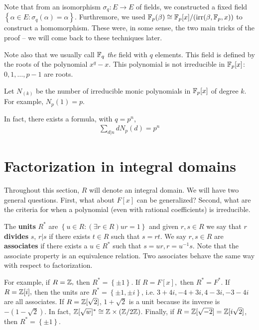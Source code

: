 \documentclass{../mathnotes}
\begin{document}
Note that from an isomorphism $\sigma_q:E\to E$ of fields, we constructed a fixed field $\left\{ \alpha\in E:\sigma_q(\alpha)=\alpha \right\}$.
Furthremore, we used $\mathbb{F}_p(\beta)\cong \mathbb{F}_p[x]/(\operatorname{irr}(\beta,\mathbb{F}_p,x))$ to construct a homomorphism. These were, in some sense, the two main tricks of the proof --
we will come back to these techniques later.

Note also that we usually call $\mathbb{F}_q$ \textit{the} field with $q$ elements. This field is defined by the roots of the polynomial $x^q-x$. This polynomial
is not irreducible in $\mathbb{F}_p[x]$: $0,1,\ldots,p-1$ are roots.

\begin{defn}
    Let $N_(k)$ be the number of irreducible monic polynomials in $\mathbb{F}_p[x]$ of degree $k$. For example, $N_p(1)=p$.
\end{defn}

In fact, there exists a formula, with $q=p^n$,
\begin{align*}
    \sum_{d|n}dN_p(d)=p^n
\end{align*}

\section{Factorization in integral domains}
Throughout this section, $R$ will denote an integral domain. We will have two general questions. First, what about $F[x]$ can be generalized?
Second, what are the criteria for when a polynomial (even with rational coefficients) is irreducible.

\begin{defn}
    The \textbf{units} $R^*$ are $\left\{ u\in R:(\exists r\in R) ur=1 \right\}$ and given $r,s\in R$ we say that
    $r$ \textbf{divides} $s$, $r|s$ if there exists $t\in R$ such that $s=rt$. We say $r,s\in R$ are \textbf{associates}
    if there exists a $u\in R^*$ such that $s=ur, r=u^{-1}s$. Note that the associate property is an equivalence relation.
    Two associates behave the same way with respect to factorization.
\end{defn}

\begin{exmp}
    For example, if $R=\mathbb{Z},$ then $R^*=\left\{ \pm 1 \right\}$. If $R=F[x],$ then $R^*=F^*$. If $R=\mathbb{Z}[i],$ then the units are $R^*=\left\{ \pm 1,\pm i \right\}$,
    i.e. $3+4i,-4+3i,4-3i,-3-4i$ are all associates. If $R=\mathbb{Z}[\sqrt{2}]$, $1+\sqrt{2}$ is a unit because its inverse is $-(1-\sqrt{2})$. In fact,
    $\mathbb{Z}[\sqrt{w}]^*\cong\mathbb{Z}\times(\mathbb{Z}/2\mathbb{Z})$. Finally, if $R=\mathbb{Z}[\sqrt{-2}]=\mathbb{Z}[i\sqrt{2}]$, then $R^*=\left\{ \pm 1 \right\}$.
\end{exmp}
\end{document}
